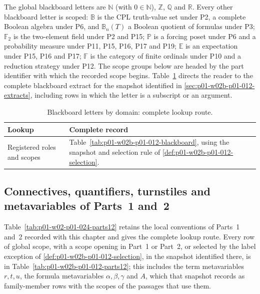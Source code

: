 The global blackboard letters are \(\mathbb N\) (with \(0\in\mathbb N\)),
\(\mathbb Z\), \(\mathbb Q\) and \(\mathbb R\).  Every other blackboard
letter is scoped: \(\mathbb B\) is the CPL truth-value set under P2, a
complete Boolean algebra under P6, and \(\mathbb B_n(T)\) a Boolean
quotient of formulas under P3; \(\mathbb F_2\) is the two-element field
under P2 and P15; \(\mathbb P\) is a forcing poset under P6 and a
probability measure under P11, P15, P16, P17 and P19; \(\mathbb E\) is an
expectation under P15, P16 and P17; \(\mathbb F\) is the category of finite
ordinals under P10 and a reduction strategy under P12.  The scope groups
below are headed by the part identifier with which the recorded scope
begins.
Table~\ref{tab:p01-w02-p01-024-blackboard} directs the reader to the
complete blackboard extract for the snapshot identified in
\cref{sec:p01-w02b-p01-012-extracts}, including rows in which the letter
is a subscript or an argument.

\begingroup\small
\begin{longtable}{@{}p{}p{}@{}}
\caption{Blackboard letters by domain: complete lookup route.}
\label{tab:p01-w02-p01-024-blackboard}\\
\toprule
Lookup & Complete record \\
\midrule
Registered roles and scopes & Table~\ref{tab:p01-w02b-p01-012-blackboard}, using the snapshot and selection rule of \cref{def:p01-w02b-p01-012-selection}. \\
\bottomrule
\end{longtable}
\endgroup

\subsection{Connectives, quantifiers, turnstiles and metavariables of
Parts~1 and~2}
\label{sec:p01-w02-p01-024-parts12}

Table~\ref{tab:p01-w02-p01-024-parts12} retains the local conventions of
Parts~1 and~2 recorded with this chapter and gives the complete lookup route.
Every row of global scope, with a scope opening in Part~1 or Part~2, or selected
by the label exception of \cref{def:p01-w02b-p01-012-selection}, in the
snapshot identified there, is in
Table~\ref{tab:p01-w02b-p01-012-parts12}; this includes the term metavariables
\(r,t,u\), the formula metavariables \(\alpha,\beta,\gamma\) and \(A\),
which that snapshot records as family-member rows with the scopes of
the passages that use them.

